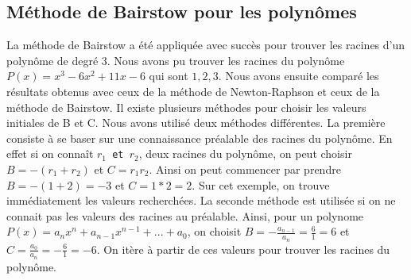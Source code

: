 \documentclass{article}
\begin{document}
\subsection{Méthode de Bairstow pour les polynômes}
La méthode de Bairstow a été appliquée avec succès pour trouver les racines d'un polynôme de degré 3. Nous avons pu trouver les racines du polynôme \(P(x) = x^3 - 6x^2 + 11x - 6\) qui sont \(1, 2, 3\). Nous avons ensuite comparé les résultats obtenus avec ceux de la méthode de Newton-Raphson et ceux de la méthode de Bairstow. Il existe plusieurs méthodes pour choisir les valeurs initiales de B et C. Nous avons utilisé deux méthodes différentes. La première consiste à se baser sur une connaissance préalable des racines du polynôme. En effet si on connaît \texttt{\(r_1\) et \(r_2\)}, deux racines du polynôme, on peut choisir \(B = -(r_1+r_2)\) et \(C = r_1r_2\). Ainsi on peut commencer par prendre \(B = -(1+2)= -3\) et \(C = 1*2 = 2\). Sur cet exemple, on trouve immédiatement les valeurs recherchées. La seconde méthode est utilisée si on ne connait pas les valeurs des racines au préalable. Ainsi, pour un polynome \(P(x) = a_n x^n + a_{n-1} x^{n-1} + ... + a_0\), on choisit \(B = -\frac{a_{n-1}}{a_n} = \frac{6}{1} = 6\) et \(C = \frac{a_0}{a_n} = -\frac{6}{1} = -6\). On itère à partir de ces valeurs pour trouver les racines du polynôme.\\ \\
\end{document}
